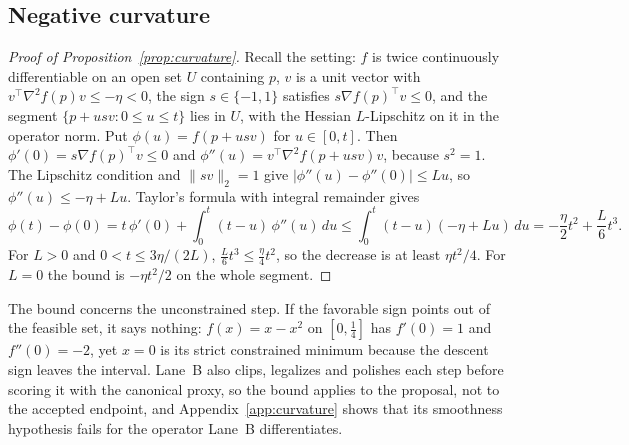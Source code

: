 \subsection{Negative curvature}

\begin{proof}[Proof of Proposition~\ref{prop:curvature}]
Recall the setting: $f$ is twice continuously differentiable on an open set $U$
containing $p$, $v$ is a unit vector with $v^{\top}\nabla^2f(p)v\le-\eta<0$, the sign
$s\in\{-1,1\}$ satisfies $s\nabla f(p)^{\top}v\le0$, and the segment
$\{p+usv:0\le u\le t\}$ lies in $U$, with the Hessian $L$-Lipschitz on it in the
operator norm. Put
$\phi(u)=f(p+usv)$ for $u\in[0,t]$. Then $\phi'(0)=s\nabla f(p)^{\top}v\le0$ and
$\phi''(u)=v^{\top}\nabla^2f(p+usv)v$, because $s^2=1$. The Lipschitz condition and
$\lVert sv\rVert_2=1$ give $|\phi''(u)-\phi''(0)|\le Lu$, so
$\phi''(u)\le-\eta+Lu$. Taylor's formula with integral remainder gives
\begin{equation*}
 \phi(t)-\phi(0)=t\,\phi'(0)+\int_0^t(t-u)\,\phi''(u)\,du
 \le\int_0^t(t-u)(-\eta+Lu)\,du=-\frac{\eta}{2}t^2+\frac{L}{6}t^3 .
\end{equation*}
For $L>0$ and $0<t\le3\eta/(2L)$, $\tfrac{L}{6}t^3\le\tfrac{\eta}{4}t^2$, so the
decrease is at least $\eta t^2/4$. For $L=0$ the bound is $-\eta t^2/2$ on the whole
segment.
\end{proof}
The bound concerns the unconstrained step. If the favorable sign points out of the
feasible set, it says nothing: $f(x)=x-x^2$ on $[0,\tfrac14]$ has $f'(0)=1$ and
$f''(0)=-2$, yet $x=0$ is its strict constrained minimum because the descent sign
leaves the interval. Lane~B also clips, legalizes and polishes each step before
scoring it with the canonical proxy, so the bound applies to the proposal, not to the
accepted endpoint, and Appendix~\ref{app:curvature} shows that its smoothness
hypothesis fails for the operator Lane~B differentiates.

